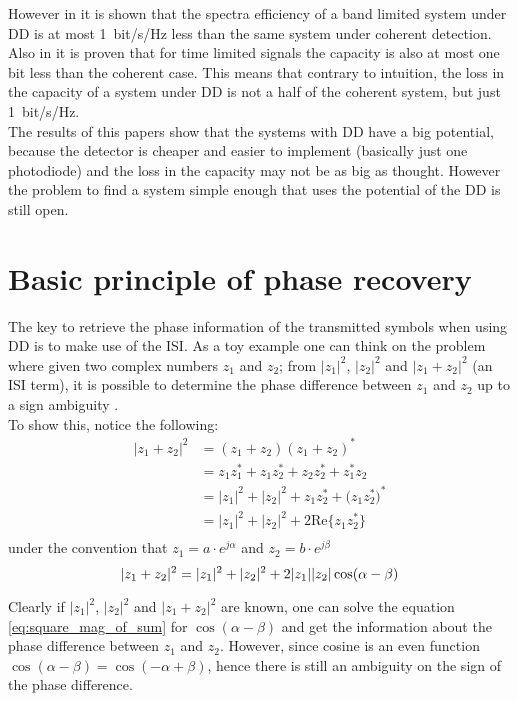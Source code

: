 However in \cite{Mecozzi_2018} it is shown that the spectra efficiency of a band limited system under DD is at most \SI{1}{bit/\s/\Hz} less than the same system under coherent detection. Also in \cite{Tasbihi_Capacity} it is proven that for time limited signals  the capacity is also at most one bit less than the coherent case. This means that contrary to intuition, the loss in the capacity of a system under DD is not a half of the coherent system, but just \SI{1}{bit/\s/\Hz}.\\

The results of this papers show that the systems with DD have a big potential, because the detector is cheaper and easier to implement (basically just one photodiode) and the loss in the capacity may not be as big as thought. However the problem to find a system simple enough that uses the potential of the DD is still open. 



\section{Basic principle of phase recovery}

The key to retrieve the phase information of the transmitted symbols when using DD is to make use of the ISI. As a toy example one can think on the problem where given two complex numbers $z_1$ and $z_2$; from $|z_1|^2$, $|z_2|^2$ and $|z_1+z_2|^2$ (an ISI term), it is possible to determine the phase difference between $z_1$ and $z_2$ up to a sign ambiguity \cite{Tasbihi_Tukey}.\\

To show this, notice the following:
\begin{align*}
	|z_1+z_2|^2 &= (z_1+z_2)(z_1+z_2)^* \\
	&=z_1z_1^*+z_1z_2^*+z_2z_2^*+z_1^*z_2\\
	&=|z_1|^2+|z_2|^2+z_1z_2^*+\bigl(z_1z_2^*\bigr)^*\\
	&=|z_1|^2+|z_2|^2+2\text{Re}\{z_1z_2^*\}\\
\end{align*}
under the convention that $z_1 = a\cdot e^{j\alpha}$ and $z_2 = b\cdot e^{j\beta}$
\begin{equation}
	|z_1+z_2|^2 =|z_1|^2+|z_2|^2+2|z_1||z_2|\cos(\alpha-\beta)\\
	\label{eq:square_mag_of_sum}
\end{equation}

Clearly if $|z_1|^2$, $|z_2|^2$ and $|z_1+z_2|^2$ are known, one can solve the equation \ref{eq:square_mag_of_sum} for $\cos(\alpha-\beta)$ and get the information about the phase difference between $z_1$ and $z_2$. However, since cosine is an even function $\cos(\alpha-\beta)=\cos(-\alpha+\beta)$, hence there is still an ambiguity on the sign of the phase difference.\\


